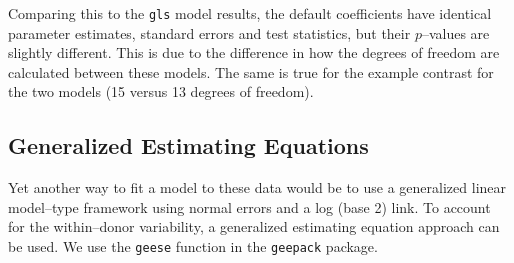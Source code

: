 \documentclass[12pt]{article}
\newcommand{\code}[1]{\mbox{\footnotesize\color{darkblue}\texttt{#1}}}
\begin{document}
Comparing this to the \code{gls} model results, the default coefficients have identical parameter estimates, standard errors and test statistics, but their $p$--values are slightly different. This is due to the difference in how the degrees of freedom are calculated between these models. The same is true for the example contrast for the two models (15 versus 13 degrees of freedom).


\subsection{Generalized Estimating Equations}      
      
Yet another way to fit a model to these data would be to use a generalized linear model--type framework using normal errors and a log (base 2) link. To account for the within--donor variability, a generalized estimating equation approach can be used. We use the \code{geese} function in the \code{geepack} package.
\end{document}
